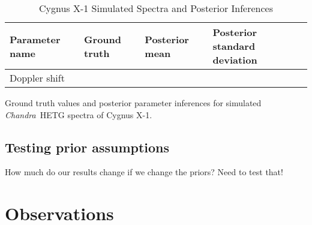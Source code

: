\documentclass[12pt]{emulateapj}
\newcommand{\project}[1]{\textsl{#1}}
\newcommand{\chandra}{\project{Chandra}}
\begin{document}
\begin{table*}[hbtp]
\renewcommand{\arraystretch}{1.3}
\footnotesize
\caption{Cygnus X-1 Simulated Spectra and Posterior Inferences}
\begin{threeparttable} 
\begin{tabularx}{\textwidth}{p{4.0cm}p{4.0cm}p{4.0cm}X}%
\toprule
\bf{Parameter name} & \bf{Ground truth} & \bf{Posterior mean} & \bf{Posterior standard deviation} \\ \midrule
Doppler shift & & & \\ 
\bottomrule
\end{tabularx}
   \begin{tablenotes}
      \item{Ground truth values and posterior parameter inferences for simulated \chandra\ HETG spectra of Cygnus X-1.}
\end{tablenotes}
\end{threeparttable}
\label{tab:cygx1_sims}
\end{table*}







\subsection{Testing prior assumptions}

How much do our results change if we change the priors? Need to test that!

\section{Observations}
\end{document}
